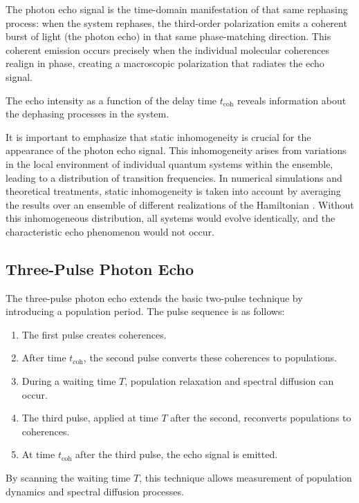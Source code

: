\noindent The photon echo signal is the time-domain manifestation of that same rephasing process: when the system rephases, the third-order polarization emits a coherent burst of light (the photon echo) in that same phase-matching direction. This coherent emission occurs precisely when the individual molecular coherences realign in phase, creating a macroscopic polarization that radiates the echo signal.

\noindent The echo intensity as a function of the delay time $t_{\text{coh}}$ reveals information about the dephasing processes in the system.

\noindent It is important to emphasize that static inhomogeneity is crucial for the appearance of the photon echo signal. This inhomogeneity arises from variations in the local environment of individual quantum systems within the ensemble, leading to a distribution of transition frequencies. In numerical simulations and theoretical treatments, static inhomogeneity is taken into account by averaging the results over an ensemble of different realizations of the Hamiltonian \cite{cho2009twodimensionalopticalspectroscopy, mukamel1995principlesnonlinearoptical}. Without this inhomogeneous distribution, all systems would evolve identically, and the characteristic echo phenomenon would not occur.

\subsection{Three-Pulse Photon Echo}
\label{subsec:three_pulse_echo}

\noindent The three-pulse photon echo extends the basic two-pulse technique by introducing a population period. The pulse sequence is as follows:

\begin{enumerate}
	\item The first pulse creates coherences.
	\item After time $t_{\text{coh}}$, the second pulse converts these coherences to populations.
	\item During a waiting time $T$, population relaxation and spectral diffusion can occur.
	\item The third pulse, applied at time $T$ after the second, reconverts populations to coherences.
	\item At time $t_{\text{coh}}$ after the third pulse, the echo signal is emitted.
\end{enumerate}

\noindent By scanning the waiting time $T$, this technique allows measurement of population dynamics and spectral diffusion processes.

